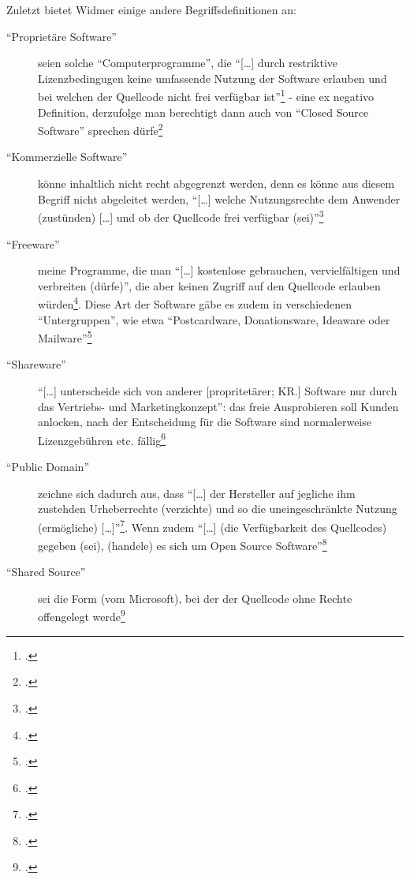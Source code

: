 \documentclass[DIV=calc,BCOR=5mm,11pt,headings=small,oneside,abstract=true, toc=bib]{scrartcl}
\begin{document}
 Zuletzt bietet Widmer einige andere Begriffsdefinitionen an:
 \begin{description}
  \item[``Proprietäre Software''] seien solche \enquote{Computerprogramme},
  die \enquote{[\ldots] durch restriktive Lizenzbedingugen keine umfassende
  Nutzung der Software erlauben und bei welchen der Quellcode nicht frei
  verfügbar ist}\footcite[vgl.][39]{Widmer2003a} - eine ex negativo
  Definition, derzufolge man berechtigt dann auch von \enquote{Closed
  Source Software} sprechen dürfe\footcite[vgl.][39]{Widmer2003a}
  \item[``Kommerzielle Software'']  könne inhaltlich nicht recht abgegrenzt
  werden, denn es könne aus diesem Begriff nicht abgeleitet werden,
  \enquote{[\ldots] welche Nutzungsrechte dem Anwender (zustünden) [\ldots]
  und ob der Quellcode frei verfügbar
  (sei)}\footcite[vgl.][40]{Widmer2003a}
  \item[``Freeware''] meine Programme, die man \enquote{[\ldots]
  kostenlose gebrauchen, vervielfältigen und verbreiten (dürfe)}, die aber
  keinen Zugriff auf den Quellcode erlauben
  würden\footcite[vgl.][40]{Widmer2003a}. Diese Art der Software gäbe es zudem
  in verschiedenen \enquote{Untergruppen}, wie etwa
  \enquote{Postcardware, Donationsware, Ideaware oder
  Mailware}\footcite[vgl.][41]{Widmer2003a}
  \item[``Shareware''] \enquote{[\ldots] unterscheide sich von anderer
  [propritetärer; KR.] Software nur durch das Vertriebs- und
  Marketingkonzept}: das freie Ausprobieren soll Kunden anlocken, nach der
  Entscheidung für die Software sind normalerweise Lizenzgebühren etc.
  fällig\footcite[vgl.][42]{Widmer2003a}
  \item[``Public Domain''] zeichne sich dadurch aus, dass \enquote{[\ldots]
  der Hersteller auf jegliche ihm zustehden Urheberrechte (verzichte) und
  so die uneingeschränkte Nutzung (ermögliche)
  [\ldots]}\footcite[vgl.][44]{Widmer2003a}. Wenn zudem \enquote{[\ldots]
  (die Verfügbarkeit des Quellcodes) gegeben (sei), (handele) es sich um
  Open Source Software}\footcite[vgl.][44. Dies ist ein
  gefährliches Fazit insofern, als Widmer selbst die Public Domain
  Software soäter als unzureichend zur Erfüllung des Open Source
  Gedankesn klassifizieren wird]{Widmer2003a}
  \item[``Shared Source''] sei die Form (vom Microsoft), bei der der Quellcode
  ohne Rechte offengelegt werde\footcite[vgl.][4ff]{Widmer2003a}
\end{description}
\end{document}
